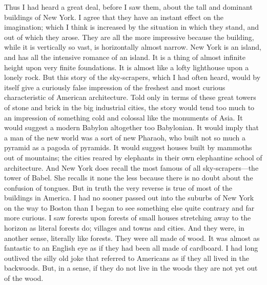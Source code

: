 \documentclass{book}
\begin{document}
Thus I had heard a great deal, before I saw them, about the tall and dominant buildings of New York. I agree that they have an instant effect on the imagination; which I think is increased by the situation in which they stand, and out of which they arose. They are all the more impressive because the building, while it is vertically so vast, is horizontally almost narrow. New York is an island, and has all the intensive romance of an island. It is a thing of almost infinite height upon very finite foundations. It is almost like a lofty lighthouse upon a lonely rock. But this story of the sky-scrapers, which I had often heard, would by itself give a curiously false impression of the freshest and most curious characteristic of American architecture. Told only in terms of these great towers of stone and brick in the big industrial cities, the story would tend too much to an impression of something cold and colossal like the monuments of Asia. It would suggest a modern Babylon altogether too Babylonian. It would imply that a man of the new world was a sort of new Pharaoh, who built not so much a pyramid as a pagoda of pyramids. It would suggest houses built by mammoths out of mountains; the cities reared by elephants in their own elephantine school of architecture. And New York does recall the most famous of all sky-scrapers—the tower of Babel. She recalls it none the less because there is no doubt about the confusion of tongues. But in truth the very reverse is true of most of the buildings in America. I had no sooner passed out into the suburbs of New York on the way to Boston than I began to see something else quite contrary and far more curious. I saw forests upon forests of small houses stretching away to the horizon as literal forests do; villages and towns and cities. And they were, in another sense, literally like forests. They were all made of wood. It was almost as fantastic to an English eye as if they had been all made of cardboard. I had long outlived the silly old joke that referred to Americans as if they all lived in the backwoods. But, in a sense, if they do not live in the woods they are not yet out of the wood.
\end{document}
